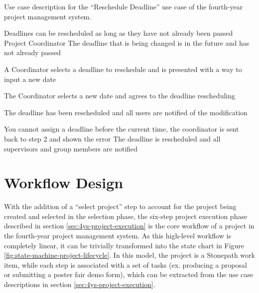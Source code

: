 \begin{table}
  \centering
  \caption{Use case description for the ``Reschedule Deadline'' use case of the fourth-year project management system.}
  \label{tbl:use-case-reschedule-deadline}

  \begin{usecase}
    Deadlines can be rescheduled as long as they have not already been passed
    Project Coordinator
    The deadline that is being changed is in the future and has not already passed
    \ucnormal
    \begin{ucenum}
      \item A Coordinator selects a deadline to reschedule and is presented with a way to input a new date
      \item The Coordinator selects a new date and agrees to the deadline rescheduling
      \item The deadline has been rescheduled and all users are notified of the modification
    \end{ucenum}
    You cannot assign a deadline before the current time, the coordinator is sent back to step 2 and shown the error
    The deadline is rescheduled and all supervisors and group members are notified
  \end{usecase}
\end{table}


\FloatBarrier

\section{Workflow Design}
\label{sec:4ys-workflow-design}

With the addition of a ``select  project'' step to account for the project being created and selected in the selection phase, the six-step project execution phase described in section \ref{sec:4ys-project-execution} is the core workflow of a project in the fourth-year project management system. As this high-level workflow is completely linear, it can be trivially transformed into the state chart in Figure \ref{fig:state-machine-project-lifecycle}. In this model, the project is a Stonepath work item, while each step is associated with a set of tasks (ex. producing a proposal or submitting a poster fair demo form), which can be extracted from the use case descriptions in section \ref{sec:4ys-project-execution}.

